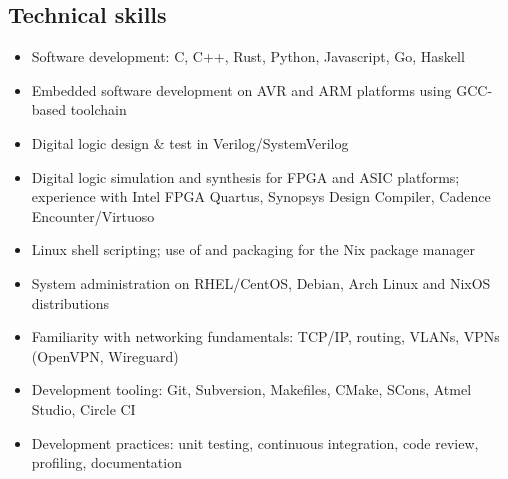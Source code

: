 
\vspace{-1.2em}

\subsection*{Technical skills}

\begin{itemize}
  \item Software development: C, C++, Rust, Python, Javascript, Go, Haskell
  \item Embedded software development on AVR and ARM platforms using GCC-based toolchain
  \item Digital logic design \& test in Verilog/SystemVerilog
  \item Digital logic simulation and synthesis for FPGA and ASIC platforms; experience with Intel FPGA Quartus, Synopsys Design Compiler, Cadence Encounter/Virtuoso
  \item Linux shell scripting; use of and packaging for the Nix package manager
  \item System administration on RHEL/CentOS, Debian, Arch Linux and NixOS distributions
  \item Familiarity with networking fundamentals: TCP/IP, routing, VLANs, VPNs (OpenVPN, Wireguard)
  \item Development tooling: Git, Subversion, Makefiles, CMake, SCons, Atmel Studio, Circle CI
  \item Development practices: unit testing, continuous integration, code review, profiling, documentation
\end{itemize}
